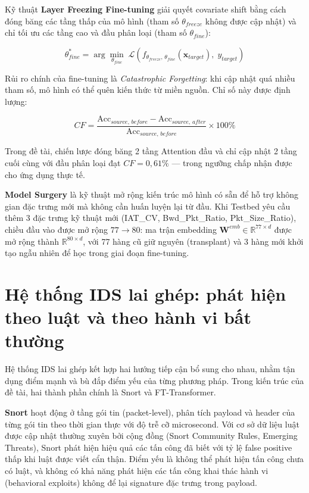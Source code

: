 \documentclass[../DoAn.tex]{subfiles}
\begin{document}
Kỹ thuật \textbf{Layer Freezing Fine-tuning} giải quyết covariate shift bằng cách đóng băng các tầng thấp của mô hình (tham số $\theta_{freeze}$ không được cập nhật) và chỉ tối ưu các tầng cao và đầu phân loại (tham số $\theta_{fine}$):

\begin{equation}
    \theta_{fine}^{*} = \arg\min_{\theta_{fine}}\; \mathcal{L}\!\left(f_{\theta_{freeze},\, \theta_{fine}}(\mathbf{x}_{target}),\; y_{target}\right)
    \label{eq:layer-freeze}
\end{equation}

Rủi ro chính của fine-tuning là \textit{Catastrophic Forgetting}: khi cập nhật quá nhiều tham số, mô hình có thể quên kiến thức từ miền nguồn. Chỉ số này được định lượng:

\begin{equation}
    CF = \frac{\text{Acc}_{source,\, before} - \text{Acc}_{source,\, after}}{\text{Acc}_{source,\, before}} \times 100\%
    \label{eq:cf}
\end{equation}

Trong đề tài, chiến lược đóng băng 2 tầng Attention đầu và chỉ cập nhật 2 tầng cuối cùng với đầu phân loại đạt $CF = 0{,}61\%$ --- trong ngưỡng chấp nhận được cho ứng dụng thực tế.

\textbf{Model Surgery} là kỹ thuật mở rộng kiến trúc mô hình có sẵn để hỗ trợ không gian đặc trưng mới mà không cần huấn luyện lại từ đầu. Khi Testbed yêu cầu thêm 3 đặc trưng kỹ thuật mới (IAT\_CV, Bwd\_Pkt\_Ratio, Pkt\_Size\_Ratio), chiều đầu vào được mở rộng $77 \rightarrow 80$: ma trận embedding $\mathbf{W}^{emb} \in \mathbb{R}^{77 \times d}$ được mở rộng thành $\mathbb{R}^{80 \times d}$, với 77 hàng cũ giữ nguyên (transplant) và 3 hàng mới khởi tạo ngẫu nhiên để học trong giai đoạn fine-tuning.

\section{Hệ thống IDS lai ghép: phát hiện theo luật và theo hành vi bất thường}
\label{sec:hybrid}

Hệ thống IDS lai ghép kết hợp hai hướng tiếp cận bổ sung cho nhau, nhằm tận dụng điểm mạnh và bù đắp điểm yếu của từng phương pháp. Trong kiến trúc của đề tài, hai thành phần chính là Snort và FT-Transformer.

\textbf{Snort} \cite{roesch1999} hoạt động ở tầng gói tin (packet-level), phân tích payload và header của từng gói tin theo thời gian thực với độ trễ cỡ microsecond. Với cơ sở dữ liệu luật được cập nhật thường xuyên bởi cộng đồng (Snort Community Rules, Emerging Threats), Snort phát hiện hiệu quả các tấn công đã biết với tỷ lệ false positive thấp khi luật được viết cẩn thận. Điểm yếu là không thể phát hiện tấn công chưa có luật, và không có khả năng phát hiện các tấn công khai thác hành vi (behavioral exploits) không để lại signature đặc trưng trong payload.
\end{document}
